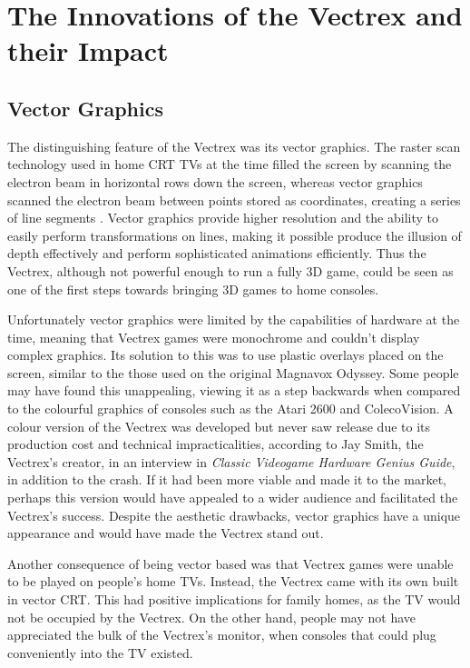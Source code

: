 \documentclass{scrartcl}
\begin{document}
\section*{The Innovations of the Vectrex and their Impact}


\subsection*{Vector Graphics}
The distinguishing feature of the Vectrex was its vector graphics. The raster scan technology used in home CRT TVs at the time filled the screen by scanning the electron beam in horizontal rows down the screen, whereas vector graphics scanned the electron beam between points stored as coordinates, creating a series of line segments \cite{wolf:medium}. Vector graphics provide higher resolution\cite{perron:theory} and the ability to easily perform transformations on lines, making it possible produce the illusion of depth effectively and perform sophisticated animations efficiently\cite{defanti:impact}. Thus the Vectrex, although not powerful enough to run a fully 3D game\cite{perron:theory}, could be seen as one of the first steps towards bringing 3D games to home consoles.

Unfortunately vector graphics were limited by the capabilities of hardware at the time, meaning that Vectrex games were monochrome and couldn't display complex graphics. Its solution to this was to use plastic overlays placed on the screen\cite{wolf:pong}, similar to the those used on the original Magnavox Odyssey. Some people may have found this unappealing, viewing it as a step backwards when compared to the colourful graphics of consoles such as the Atari 2600 and ColecoVision. A colour version of the Vectrex was developed\cite{defanti:impact} but never saw release due to its production cost and technical impracticalities, according to Jay Smith, the Vectrex's creator, in an interview in \textit{Classic Videogame Hardware Genius Guide}\cite{imagine:genius}, in addition to the crash. If it had been more viable and made it to the market, perhaps this version would have appealed to a wider audience and facilitated the Vectrex's success. Despite the aesthetic drawbacks, vector graphics have a unique appearance and would have made the Vectrex stand out. 

Another consequence of being vector based was that Vectrex games were unable to be played on people's home TVs. Instead, the Vectrex came with its own built in vector CRT\cite{vectrex:manual}. This had positive implications for family homes, as the TV would not be occupied by the Vectrex. On the other hand, people may not have appreciated the bulk of the Vectrex's monitor, when consoles that could plug conveniently into the TV existed.
\end{document}
